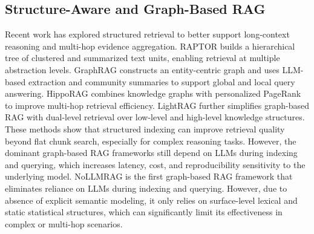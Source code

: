 \documentclass[conference]{IEEEtran}
\begin{document}

\subsection{Structure-Aware and Graph-Based RAG}
Recent work has explored structured retrieval to better support long-context reasoning and multi-hop evidence aggregation. RAPTOR \cite{sarthi2024raptor} builds a hierarchical tree of clustered and summarized text units, enabling retrieval at multiple abstraction levels. GraphRAG \cite{edge2024local} constructs an entity-centric graph and uses LLM-based extraction and community summaries to support global and local query answering. HippoRAG \cite{gutierrez2024hipporag} combines knowledge graphs with personalized PageRank to improve multi-hop retrieval efficiency. LightRAG \cite{guo2024lightrag} further simplifies graph-based RAG with dual-level retrieval over low-level and high-level knowledge structures. These methods show that structured indexing can improve retrieval quality beyond flat chunk search, especially for complex reasoning tasks. However, the dominant graph-based RAG frameworks still depend on LLMs during indexing and querying, which increases latency, cost, and reproducibility sensitivity to the underlying model. NoLLMRAG \cite{yunollmrag} is the first graph-based RAG framework that eliminates reliance on LLMs during indexing and querying. However, due to absence of explicit semantic modeling, it only relies on surface-level lexical and
static statistical structures, which can significantly limit its effectiveness in complex or multi-hop scenarios.
\end{document}
